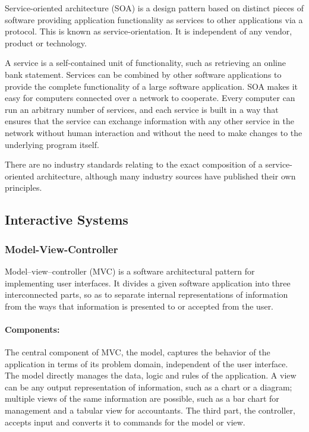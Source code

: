 Service-oriented architecture (SOA) is a design pattern based on distinct pieces of software providing application functionality as services to other applications via a protocol. This is known as service-orientation. It is independent of any vendor, product or technology.

A service is a self-contained unit of functionality, such as retrieving an online bank statement. Services can be combined by other software applications to provide the complete functionality of a large software application. SOA makes it easy for computers connected over a network to cooperate. Every computer can run an arbitrary number of services, and each service is built in a way that ensures that the service can exchange information with any other service in the network without human interaction and without the need to make changes to the underlying program itself.

There are no industry standards relating to the exact composition of a service-oriented architecture, although many industry sources have published their own principles.

\subsection{Interactive Systems}
\subsubsection{Model-View-Controller}

Model–view–controller (MVC) is a software architectural pattern for implementing user interfaces. It divides a given software application into three interconnected parts, so as to separate internal representations of information from the ways that information is presented to or accepted from the user.

\paragraph{Components:}

The central component of MVC, the model, captures the behavior of the application in terms of its problem domain, independent of the user interface. The model directly manages the data, logic and rules of the application. A view can be any output representation of information, such as a chart or a diagram; multiple views of the same information are possible, such as a bar chart for management and a tabular view for accountants. The third part, the controller, accepts input and converts it to commands for the model or view.

